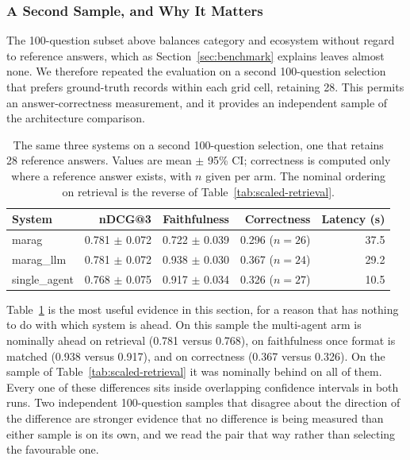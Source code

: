 \documentclass[acmsmall,review,anonymous,screen]{acmart}
\begin{document}
\subsubsection{A Second Sample, and Why It Matters}

The 100-question subset above balances category and ecosystem without regard to
reference answers, which as Section~\ref{sec:benchmark} explains leaves almost
none. We therefore repeated the evaluation on a second 100-question selection
that prefers ground-truth records within each grid cell, retaining 28. This
permits an answer-correctness measurement, and it provides an independent sample
of the architecture comparison.

\begin{table}[t]
\caption{The same three systems on a second 100-question selection, one that
retains 28 reference answers. Values are mean $\pm$ 95\% CI; correctness is
computed only where a reference answer exists, with $n$ given per arm. The
nominal ordering on retrieval is the reverse of
Table~\ref{tab:scaled-retrieval}.}
\label{tab:gt-run}
\begin{tabular}{lrrrr}
\toprule
System & nDCG@3 & Faithfulness & Correctness & Latency (s) \\
\midrule
marag         & 0.781 $\pm$ 0.072 & 0.722 $\pm$ 0.039 & 0.296 ($n=26$) & 37.5 \\
marag\_llm    & 0.781 $\pm$ 0.072 & 0.938 $\pm$ 0.030 & 0.367 ($n=24$) & 29.2 \\
single\_agent & 0.768 $\pm$ 0.075 & 0.917 $\pm$ 0.034 & 0.326 ($n=27$) & 10.5 \\
\bottomrule
\end{tabular}
\end{table}

Table~\ref{tab:gt-run} is the most useful evidence in this section, for a reason
that has nothing to do with which system is ahead. On this sample the
multi-agent arm is nominally ahead on retrieval (0.781 versus 0.768), on
faithfulness once format is matched (0.938 versus 0.917), and on correctness
(0.367 versus 0.326). On the sample of Table~\ref{tab:scaled-retrieval} it was
nominally behind on all of them. Every one of these differences sits inside
overlapping confidence intervals in both runs. Two independent 100-question
samples that disagree about the direction of the difference are stronger
evidence that no difference is being measured than either sample is on its own,
and we read the pair that way rather than selecting the favourable one.
\end{document}

